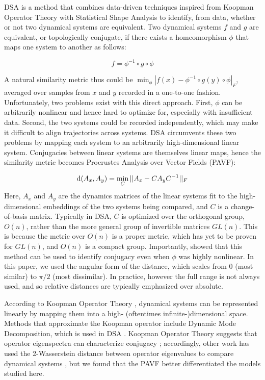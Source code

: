 \documentclass{article}
\begin{document}
DSA is a method that combines data-driven techniques inspired from Koopman Operator Theory with Statistical Shape Analysis to identify, from data, whether or not two dynamical systems are equivalent. Two dynamical systems $f$ and $g$ are equivalent, or topologically conjugate, if there exists a homeomorphism $\phi$ that maps one system to another as follows:

\begin{equation}
f = \phi^{-1} \circ g \circ \phi
\end{equation}

A natural similarity metric thus could be $\min_\phi \left | f(x) - \phi^{-1} \circ g(y) \circ \phi \right |_F$, averaged over samples from $x$ and $y$ recorded in a one-to-one fashion. Unfortunately, two problems exist with this direct approach. First, $\phi$ can be arbitrarily nonlinear and hence hard to optimize for, especially with insufficient data. Second, the two systems could be recorded independently, which may make it difficult to align trajectories across systems. DSA circumvents these two problems by mapping each system to an arbitrarily high-dimensional linear system. Conjugacies between linear systems are themselves linear maps, hence the similarity metric becomes Procrustes Analysis over Vector Fields (PAVF):

\begin{equation}\label{dsasupp}
\textnormal{d}(A_x,A_y) = \min_{C}||A_x - C A_y C^{-1}||_F
\end{equation}
Here, $A_x$ and $A_y$ are the dynamics matrices of the linear systems fit to the high-dimensional embeddings of the two systems being compared, and $C$ is a change-of-basis matrix. Typically in DSA, $C$ is optimized over the orthogonal group, $O(n)$, rather than the more general group of invertible matrices $GL(n)$. This is because the metric over $O(n)$ is a proper metric, which has yet to be proven for $GL(n)$, and $O(n)$ is a compact group. Importantly, \cite{ostrow_dsa} showed that this method can be used to identify conjugacy even when $\phi$ was highly nonlinear. In this paper, we used the angular form of the distance, which scales from $0$ (most similar) to $\pi/2$ (most dissimilar). In practice, however the full range is not always used, and so relative distances are typically emphasized over absolute.

According to Koopman Operator Theory \cite{mezic2005spectral}, dynamical systems can be represented linearly by mapping them into a high- (oftentimes infinite-)dimensional space. Methods that approximate the Koopman operator include Dynamic Mode Decomposition, which is used in DSA \cite{brunton_chaos_2017}. Koopman Operator Theory suggests that operator eigenspectra can characterize conjugacy \cite{budisic_applied_2012}; accordingly, other work has used the 2-Wasserstein distance between operator eigenvalues to compare dynamical systems \cite{redman2024identifying}, but we found that the PAVF better differentiated the models studied here.
\end{document}
